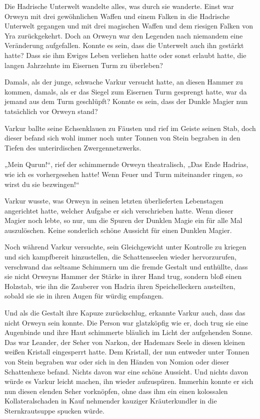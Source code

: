 \documentclass[10pt, a4paper, oneside]{book}
\begin{document}
Die Hadrische Unterwelt wandelte alles, was durch sie wanderte. Einst war Orweyn mit drei gewöhnlichen Waffen und einem Falken in die Hadrische Unterwelt gegangen und mit drei magischen Waffen und dem riesigen Falken von Yra zurückgekehrt. Doch an Orweyn war den Legenden nach niemandem eine Veränderung aufgefallen. Konnte es sein, dass die Unterwelt auch ihn gestärkt hatte? Dass sie ihm Ewiges Leben verliehen hatte oder sonst erlaubt hatte, die langen Jahrzehnte im Eisernen Turm zu überleben?

Damals, als der junge, schwache Varkur versucht hatte, an diesen Hammer zu kommen, damals, als er das Siegel zum Eisernen Turm gesprengt hatte, war da jemand aus dem Turm geschlüpft? Konnte es sein, dass der Dunkle Magier nun tatsächlich vor Orweyn stand?

Varkur ballte seine Echsenklauen zu Fäusten und rief im Geiste seinen Stab, doch dieser befand sich wohl immer noch unter Tonnen von Stein begraben in den Tiefen des unterirdischen Zwergennetzwerks.

„Mein Qurun!“, rief der schimmernde Orweyn theatralisch, „Das Ende Hadrias, wie ich es vorhergesehen hatte! Wenn Feuer und Turm miteinander ringen, so wirst du sie bezwingen!“

Varkur wusste, was Orweyn in seinen letzten überlieferten Lebenstagen angerichtet hatte, welcher Aufgabe er sich verschrieben hatte. Wenn dieser Magier noch lebte, so nur, um die Spuren der Dunklen Magie ein für alle Mal auszulöschen. Keine sonderlich schöne Aussicht für einen Dunklen Magier.

Noch während Varkur versuchte, sein Gleichgewicht unter Kontrolle zu kriegen und sich kampfbereit hinzustellen, die Schattenseelen wieder hervorzurufen, verschwand das seltsame Schimmern um die fremde Gestalt und enthüllte, dass sie nicht Orweyns Hammer der Stärke in ihrer Hand trug, sondern bloß einen Holzstab, wie ihn die Zauberer von Hadria ihren Speichelleckern austeilten, sobald sie sie in ihren Augen für würdig empfangen.

Und als die Gestalt ihre Kapuze zurückschlug, erkannte Varkur auch, dass das nicht Orweyn sein konnte. Die Person war glatzköpfig wie er, doch trug sie eine Augenbinde und ihre Haut schimmerte bläulich im Licht der aufgehenden Sonne. Das war Leander, der Seher von Narkon, der Hademars Seele in diesen kleinen weißen Kristall eingesperrt hatte. Dem Kristall, der nun entweder unter Tonnen von Stein begraben war oder sich in den Händen von Nomion oder dieser Schattenhexe befand. Nichts davon war eine schöne Aussicht. Und nichts davon würde es Varkur leicht machen, ihn wieder aufzuspüren. Immerhin konnte er sich nun diesen elenden Seher vorknöpfen, ohne dass ihm ein einen kolossalen Kollateralschaden in Kauf nehmender kauziger Kräuterkundler in die Sternkrautsuppe spucken würde.
\end{document}
